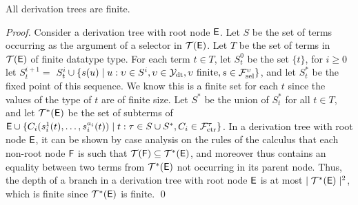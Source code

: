 \begin{lemma}[Termination]%
\label{lem:t}%
\afterDot
All derivation trees are finite.
\end{lemma}
\begin{proof}
Consider a derivation tree with root node $\mathsf{E}$.
Let $S$ be the set of terms occurring as the argument of a selector in $\mathcal{T}(\mathsf{E})$.
Let $T$ be the set of terms in $\mathcal{T}(\mathsf{E})$ of finite datatype type.
For each term $t \in T$,
let $S^0_t$ be the set $\{ t \}$,
for $i \geq 0$ let $S^{i+1}_t =$ $S^i_t \cup \{ s( u ) \mid u : \upsilon \in S^i, \upsilon \in \mathcal{Y}_{\mathrm{dt}}, \upsilon \text{ finite}, s \in \mathcal{F}_{\mathrm{sel}}^{\upsilon}  \}$,
and let $S^\ast_t$ be the fixed point of this sequence.
We know this is a finite set for each $t$ since the values of the type of $t$ are of finite size.
Let $S^\ast$ be the union of $S^\ast_t$ for all $t \in T$,
and let $\mathcal{T}^\ast(\mathsf{E})$ be the set of subterms of $\mathsf{E} \cup \{ C_i( s^1_i( t ), \ldots, s^{a_i}_i( t ) ) \mid t : \tau \in S \cup S^\ast, C_i \in \mathcal{F}_{\mathrm{ctr}}^\tau \}$.
In a derivation tree with root node $\mathsf{E}$, 
it can be shown by case analysis on the rules of the calculus that each non-root node $\mathsf{F}$ is such that 
$\mathcal{T}(\mathsf{F}) \subseteq \mathcal{T}^\ast(\mathsf{E})$, and moreover thus contains an equality between two terms from $\mathcal{T}^\ast(\mathsf{E})$ not occurring in its parent node.
Thus, the depth of a branch in a derivation tree with root node $\mathsf{E}$ is at most $\mid \mathcal{T}^\ast(\mathsf{E}) \mid^2$,
which is finite since $\mathcal{T}^\ast(\mathsf{E})$ is finite.
\qed
\end{proof}

